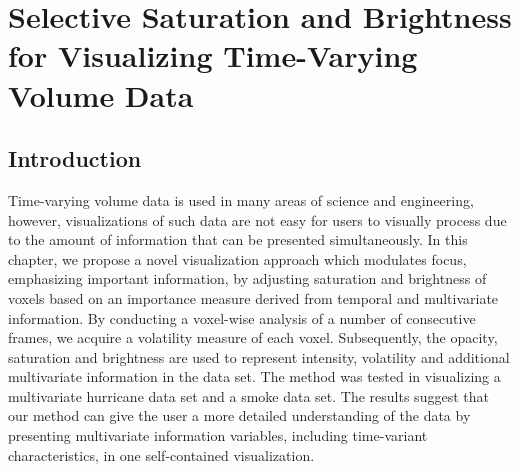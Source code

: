 \chapter{Selective Saturation and Brightness for Visualizing Time-Varying Volume Data \label{selective_saturation_brightness}}

\section{Introduction}

Time-varying volume data is used in many areas of science and engineering, however, visualizations of such data are not easy for users to visually process due to the amount of information that can be presented simultaneously. In this chapter, we propose a novel visualization approach which modulates focus, emphasizing important information, by adjusting saturation and brightness of voxels based on an importance measure derived from temporal and multivariate information. By conducting a voxel-wise analysis of a number of consecutive frames, we acquire a volatility measure of each voxel.
Subsequently, the opacity, saturation and brightness are used to represent intensity, volatility and additional multivariate information in the data set.
The method was tested in visualizing a multivariate hurricane data set and a smoke data set. The results suggest that our method can give the user a more detailed understanding of the data by presenting multivariate information variables, including time-variant characteristics, in one self-contained visualization.

%

